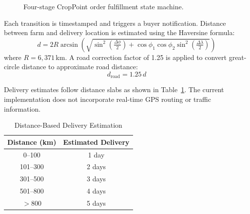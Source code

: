\documentclass[conference]{IEEEtran}
\begin{document}
\begin{figure}[htbp]
\centering
{}
\caption{Four-stage CropPoint order fulfillment state machine.}
\label{fig:state}
\end{figure}

Each transition is timestamped and triggers a buyer notification.
Distance between farm and delivery location is estimated using the
Haversine formula:
\begin{equation}
d = 2R\arcsin\!\left(\sqrt{
    \sin^2\!\left(\tfrac{\Delta\phi}{2}\right)
    + \cos\phi_1\cos\phi_2\sin^2\!\left(\tfrac{\Delta\lambda}{2}\right)
}\right)
\label{eq:haversine}
\end{equation}
where $R = 6{,}371$\,km. A road correction factor of 1.25 is
applied to convert great-circle distance to approximate road
distance:
\begin{equation}
    d_{\mathrm{road}} = 1.25\,d
\end{equation}

Delivery estimates follow distance slabs as shown in
Table~\ref{tab:distance}. The current implementation does not
incorporate real-time GPS routing or traffic information.

\begin{table}[htbp]
\centering
\caption{Distance-Based Delivery Estimation}
\label{tab:distance}
\begin{tabular}{cc}
\toprule
\textbf{Distance (km)} & \textbf{Estimated Delivery} \\
\midrule
0--100     & 1 day  \\
101--300   & 2 days \\
301--500   & 3 days \\
501--800   & 4 days \\
$>$800     & 5 days \\
\bottomrule
\end{tabular}
\end{table}
\end{document}
